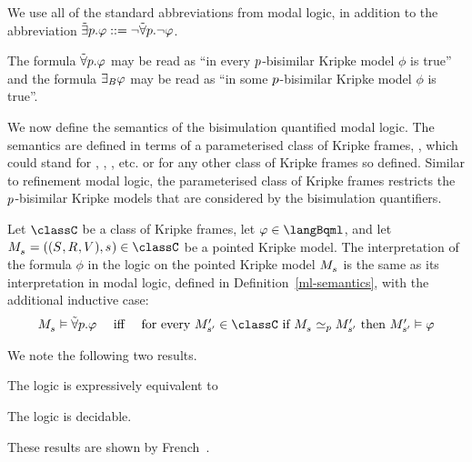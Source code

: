 We use all of the standard abbreviations from modal logic, in addition to the abbreviation ${\tilde\exists {p} . } \varphi ::= \lnot {\tilde\forall {p} . } \lnot \varphi$.

The formula ${\tilde\forall {p} . } \varphi$ may be read as ``in every $p$-bisimilar Kripke model $\phi$ is true'' and the formula ${\exists_{B}} \varphi$ may be read as ``in some $p$-bisimilar Kripke model $\phi$ is true''.

We now define the semantics of the bisimulation quantified modal logic.
The semantics are defined in terms of a parameterised class of Kripke frames, \classC{}, which could stand for \classK{}, \classKF{}, \classKFF{}, etc. or for any other class of Kripke frames so defined.
Similar to refinement modal logic, the parameterised class of Kripke frames restricts the $p$-bisimilar Kripke models that are considered by the bisimulation quantifiers.

\begin{definition}
Let $\classC$ be a class of Kripke frames, let $\phi \in \langBqml$, and let $\kPModelAndTuple{\kStateS} \in \classC$ be a pointed Kripke model.
The interpretation of the formula $\phi$ in the logic \logicBqmlC{} on the pointed Kripke model $\kPModel{\kStateS}$ is the same as its interpretation in modal logic, defined in Definition~\ref{ml-semantics}, with the additional inductive case:
$$
\begin{array}{lcl}
    \kPModel{\kStateS} \entails \allbisimsP \phi & \text{ iff } & \text{for every } \kPModelP{\kStateSP} \in \classC \text{ if } \kPModel{\kStateS} \bisimilar[\atomP] \kPModelP{\kStateSP} \text{ then } \kPModelP{\kStateSP} \entails \phi
\end{array}
$$
\end{definition}

We note the following two results.

\begin{proposition}
The logic \logicBqmlKF{} is expressively equivalent to \logicMuKF{}
\end{proposition}

\begin{proposition}
The logic \logicBqmlKF{} is decidable.
\end{proposition}

These results are shown by French~\cite{french-decidability:2006}.
